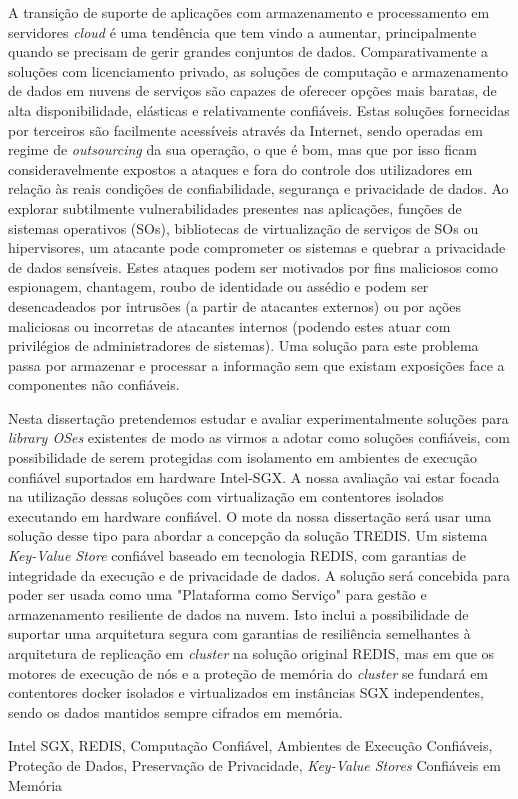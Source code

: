 A transição de suporte de aplicações com armazenamento e processamento em servidores \textit{cloud} é uma tendência que tem vindo a aumentar, principalmente quando se precisam de gerir grandes conjuntos de dados. Comparativamente a soluções com licenciamento privado, as soluções de computação e armazenamento de dados em nuvens de serviços são capazes de oferecer opções mais baratas, de alta disponibilidade, elásticas e relativamente confiáveis. Estas soluções fornecidas por terceiros são facilmente acessíveis através da Internet, sendo operadas em regime de \textit{outsourcing} da sua operação, o que é bom, mas que por isso ficam consideravelmente expostos a ataques e fora do controle dos utilizadores em relação às reais condições de confiabilidade, segurança e privacidade de dados. Ao explorar subtilmente vulnerabilidades presentes nas aplicações, funções de sistemas operativos (SOs), bibliotecas de virtualização de serviços de SOs ou hipervisores, um atacante pode comprometer os sistemas e quebrar a privacidade de dados sensíveis. Estes ataques podem ser motivados por fins maliciosos como espionagem, chantagem, roubo de identidade ou assédio e podem ser desencadeados por intrusões (a partir de atacantes externos) ou por ações maliciosas ou incorretas de atacantes internos (podendo estes atuar com privilégios de administradores de sistemas). Uma solução para este problema passa por armazenar e processar a informação sem que existam exposições face a componentes não confiáveis. 

Nesta dissertação pretendemos estudar e avaliar experimentalmente soluções para \textit{library OSes} existentes de modo as virmos a adotar como soluções confiáveis, com possibilidade de serem protegidas com isolamento em ambientes de execução confiável suportados em hardware Intel-SGX. A nossa avaliação vai estar focada na utilização dessas soluções com virtualização em contentores isolados executando em hardware confiável. O mote da nossa dissertação será usar uma solução desse tipo para abordar a concepção da solução TREDIS. Um sistema \textit{Key-Value Store} confiável baseado em tecnologia REDIS, com garantias de integridade da execução e de privacidade de dados. A solução será concebida para poder ser usada como uma "Plataforma como Serviço" para gestão e armazenamento resiliente de dados na nuvem. Isto inclui a possibilidade de suportar uma arquitetura segura com garantias de resiliência semelhantes à arquitetura de replicação em \textit{cluster} na solução original REDIS, mas em que os motores de execução de nós e a proteção de memória do \textit{cluster} se fundará em contentores docker isolados e virtualizados em instâncias SGX independentes, sendo os dados mantidos sempre cifrados em memória.

 
	
\begin{keywords}
 Intel SGX, REDIS, Computação Confiável, Ambientes de Execução Confiáveis, Proteção de Dados, Preservação de Privacidade, \textit{Key-Value Stores} Confiáveis em Memória
\end{keywords}


	
